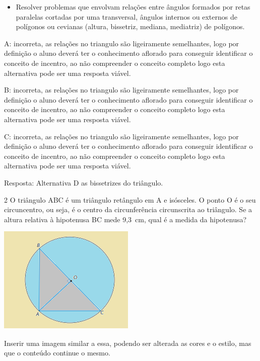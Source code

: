 \begin{itemize}
\tightlist

\item 
  Resolver problemas que envolvam relações entre ângulos formados por
  retas paralelas cortadas por uma transversal, ângulos internos ou
  externos de polígonos ou cevianas (altura, bissetriz, mediana,
  mediatriz) de polígonos.
\end{itemize}

A: incorreta, as relações no triangulo são ligeiramente semelhantes,
logo por definição o aluno deverá ter o conhecimento aflorado para
conseguir identificar o conceito de incentro, ao não compreender o
conceito completo logo esta alternativa pode ser uma resposta viável.

B: incorreta, as relações no triangulo são ligeiramente semelhantes,
logo por definição o aluno deverá ter o conhecimento aflorado para
conseguir identificar o conceito de incentro, ao não compreender o
conceito completo logo esta alternativa pode ser uma resposta viável.

C: incorreta, as relações no triangulo são ligeiramente semelhantes,
logo por definição o aluno deverá ter o conhecimento aflorado para
conseguir identificar o conceito de incentro, ao não compreender o
conceito completo logo esta alternativa pode ser uma resposta viável.

Resposta: Alternativa D as bissetrizes do triângulo.

\num{2} O triângulo ABC é um triângulo retângulo em A e isósceles. O ponto O
é o seu circuncentro, ou seja, é o centro da circunferência circunscrita
ao triângulo. Se a altura relativa à hipotenusa BC mede 9,3~cm, qual é a
medida da hipotenusa?

\includegraphics[width=2\times 5625in,height=2\times 02083in]{./imgSAEB_8_MAT/media/image35.png}

Inserir uma imagem similar a essa, podendo ser alterada as cores e o
estilo, mas que o conteúdo continue o mesmo.

